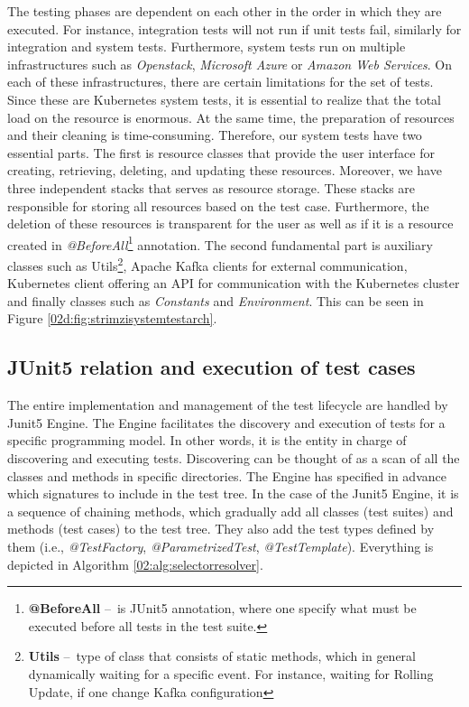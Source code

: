 The testing phases are dependent on each other in the order in which they are executed. For instance, integration tests will not run if unit tests fail, similarly for integration and system tests. Furthermore, system tests run on multiple infrastructures such as \emph{Openstack}, \emph{Microsoft Azure} or \emph{Amazon Web Services}. On each of these infrastructures, there are certain limitations for the set of tests. Since these are Kubernetes system tests, it is essential to realize that the total load on the resource is enormous. At the same time, the preparation of resources and their cleaning is time-consuming. Therefore, our system tests have two essential parts. The first is resource classes that provide the user interface for creating, retrieving, deleting, and updating these resources.
Moreover, we have three independent stacks that serves as resource storage. These stacks are responsible for storing all resources based on the test case. Furthermore, the deletion of these resources is transparent for the user as well as if it is a resource created in \emph{@BeforeAll}\footnote{\textbf{@BeforeAll } \---\ is JUnit5 annotation, where one specify what must be executed before all tests in the test suite.} annotation. The second fundamental part is auxiliary classes such as Utils\footnote {\textbf{Utils} \---\ type of class that consists of static methods, which in general dynamically waiting for a specific event. For instance, waiting for Rolling Update, if one change Kafka configuration}, Apache Kafka clients for external communication, Kubernetes client offering an API for communication with the Kubernetes cluster and finally classes such as \emph{Constants} and \emph{Environment}. This can be seen in Figure \ref{02d:fig:strimzisystemtestarch}.

\subsection{JUnit5 relation and execution of test cases}
\label{02:subsec:strimziJunit5relation:execution}

The entire implementation and management of the test lifecycle are handled by Junit5 Engine. The Engine facilitates the discovery and execution of tests for a specific programming model. In other words, it is the entity in charge of discovering and executing tests. Discovering can be thought of as a scan of all the classes and methods in specific directories. The Engine has specified in advance which signatures to include in the test tree. In the case of the Junit5 Engine, it is a sequence of chaining methods, which gradually add all classes (test suites) and methods (test cases) to the test tree. They also add the test types defined by them (i.e., \emph{@TestFactory}, \emph{@ParametrizedTest}, \emph{@TestTemplate}). Everything is depicted in Algorithm \ref{02:alg:selectorresolver}. 

